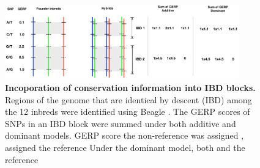 \documentclass[9pt,twocolumn,twoside]{gsajnl}
\begin{document}
\DIFdelbegin \DIFdelend \DIFaddbegin \begin{figure}[h]
\DIFaddendFL \includegraphics[width=0.9\textwidth]{SFig_gerpIBD.pdf}
\caption{
\textbf{Incoporation of conservation information into IBD blocks.}
Regions of the genome that are identical by descent (IBD) among the 12 inbreds were identified using Beagle \citep{Browning2009}.  The GERP scores of SNPs in an IBD block were summed under both additive and dominant models. \DIFdelbeginFL {}\DIFdelendFL \DIFaddbeginFL {}\DIFaddendFL GERP score \DIFdelbeginFL {}\DIFdelendFL \DIFaddbeginFL {}\DIFaddendFL the \DIFaddbeginFL {}\DIFaddendFL non-reference \DIFdelbeginFL {}\DIFdelendFL \DIFaddbeginFL {}\DIFaddendFL was assigned \DIFdelbeginFL {}\DIFdelendFL \DIFaddbeginFL {}\DIFaddendFL , \DIFdelbeginFL {}\DIFdelendFL \DIFaddbeginFL {}\DIFaddendFL assigned \DIFdelbeginFL {}\DIFdelendFL \DIFaddbeginFL {}\DIFaddendFL the \DIFdelbeginFL {}\DIFdelendFL reference \DIFdelbeginFL {}\DIFdelendFL \DIFaddbeginFL {}\DIFaddendFL Under the dominant model, \DIFdelbeginFL {}\DIFdelendFL both \DIFdelbeginFL {}\DIFdelendFL \DIFaddbeginFL {}\DIFaddendFL and \DIFdelbeginFL {}\DIFdelendFL the \DIFdelbeginFL {}\DIFdelendFL \DIFaddbeginFL {}\DIFaddendFL reference \DIFdelbeginFL {}\DIFdelendFL \DIFaddbeginFL {}\DIFaddendFL }
\label{fig:gerpibd}
\end{figure}
\end{document}
